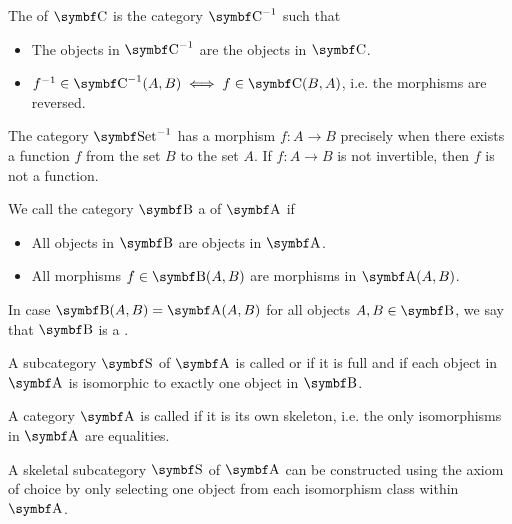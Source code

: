 \begin{definition}\label{def:opposite_category}\cite[construction 1.1.9]{Leinster2014}
  The  of \( \Bold C \) is the category \( \Bold C^{-1} \) such that
  \begin{itemize}
    \item The objects in \( \Cat{C}^{-1} \) are the objects in \( \Bold{C} \).
    \item \( f^{-1} \in \Cat{C}^{-1}(A, B) \iff f \in \Bold{C}(B, A) \), i.e. the morphisms are reversed.
  \end{itemize}
\end{definition}

\begin{example}
  The category \( \Cat{Set}^{-1} \) has a morphism \( f: A \to B \) precisely when there exists a function \( f \) from the set \( B \) to the set \( A \). If \( f: A \to B \) is not invertible, then \( f \) is not a function.
\end{example}

\begin{definition}\label{def:subcategory}\cite[definition 1.2.18]{Leinster2014}
  We call the category \( \Bold B \) a  of \( \Bold A \) if
  \begin{itemize}
    \item All objects in \( \Bold B \) are objects in \( \Bold A \).
    \item All morphisms \( f \in \Cat{B}(A, B) \) are morphisms in \( \Bold{A}(A, B) \).
  \end{itemize}

  In case \( \Cat{B}(A, B) = \Bold{A}(A, B) \) for all objects \( A, B \in \Bold B \), we say that \( \Bold B \) is a .
\end{definition}

\begin{definition}\label{def:skeletal_category}\cite[91]{MacLane1994}
  A subcategory \( \Bold S \) of \( \Bold A \) is called  or  if it is full and if each object in \( \Bold A \) is isomorphic to exactly one object in \( \Bold B \).

  A category \( \Bold A \) is called  if it is its own skeleton, i.e. the only isomorphisms in \( \Bold A \) are equalities.
\end{definition}

\begin{remark}\label{remark:skeletal_subcategory_exists}
   A skeletal subcategory \( \Bold S \) of \( \Bold A \) can be constructed using the axiom of choice by only selecting one object from each isomorphism class within \( \Bold A \).
\end{remark}

